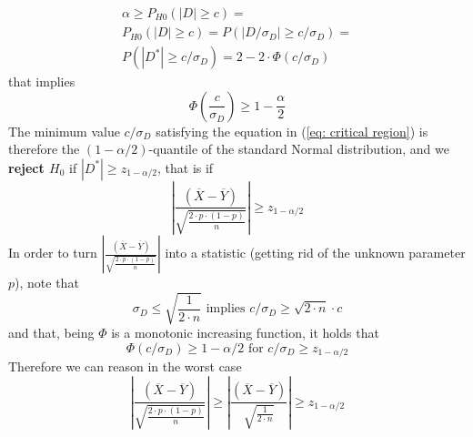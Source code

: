 \documentclass[14pt]{article}
\begin{document}
\begin{equation}
\begin{split}
 \alpha\geq P_{H{0}} (\left | D \right |\geq c)=\\
 P_{H{0}} (\left | D \right |\geq c)= P(\left | D /\sigma_{D}\right |\geq c/\sigma_{D})=\\
P(\left | D^{*}\right |\geq c/\sigma_{D})=2-2\cdot\Phi(c/\sigma_{D})
  \end{split}
 \end{equation}\newline
 that implies 
 \begin{equation}\label{eq: critical region}
\Phi\left ( \frac{c}{\sigma_{D}}\right ) \geq1-\frac{\alpha}{2}
\end{equation}\newline
The minimum value $c/\sigma_{D}$ satisfying the equation in (\ref{eq: critical region}) is therefore the $(1-\alpha/2)$-quantile of the standard Normal distribution, and we \textbf{reject $H_{0}$} if $\left |D^{*} \right | \geq z_{1-\alpha/2}  $, that is if \\
\begin{equation}
\left |\frac{(\overline{X}-\overline{Y})}{\sqrt{\frac{2 \cdot p \cdot(1-p)}{n}}}\right | \geq  z_{1-\alpha/2} \end{equation}\newline
In order to turn $\left |\frac{(\overline{X}-\overline{Y})}{\sqrt{\frac{2 \cdot p \cdot(1-p)}{n}}}\right |$ into a statistic (getting rid of the unknown parameter $p$), note that
\begin{equation}
  \sigma_{D} \leq \sqrt{\frac{1}{2\cdot n}} \text{ implies } c/\sigma_{D}\geq \sqrt{2\cdot n}\cdot c
\end{equation}\newline
and that, being $\Phi$ is a  monotonic increasing function, it holds that 
\begin{equation}\Phi(c/\sigma_{D})\geq 1-\alpha/2 \text{ for } c/\sigma_{D}\geq z_{1-\alpha/2}\end{equation}
Therefore we can reason in the worst case 
\begin{equation}\label{eq: critical value chain}
\left | \frac{(\overline{X}-\overline{Y})}{\sqrt{\frac{2 \cdot p \cdot(1-p)}{n}}} \right | \geq \left | \frac{(\overline{X}-\overline{Y})}{\sqrt{\frac{1}{2 \cdot n}}} \right | \geq z_{1-\alpha/2}
\end{equation}
\end{document}
